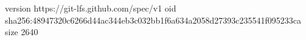 version https://git-lfs.github.com/spec/v1
oid sha256:48947320c6266d44ac344eb3c032bb1f6a634a2058d27393c235541f095233ca
size 2640
